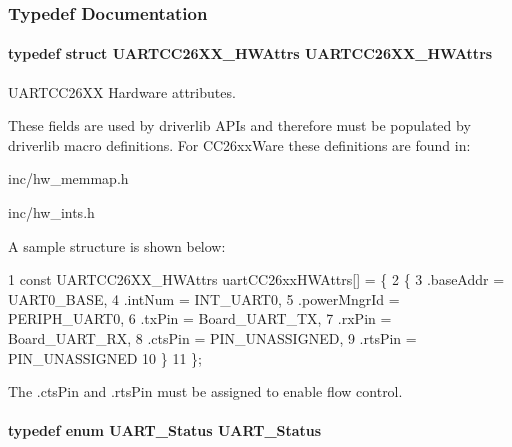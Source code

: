 \subsubsection{Typedef Documentation}
\paragraph[{U\+A\+R\+T\+C\+C26\+X\+X\+\_\+\+H\+W\+Attrs}]{\setlength{\rightskip}{0pt plus 5cm}typedef struct {\bf U\+A\+R\+T\+C\+C26\+X\+X\+\_\+\+H\+W\+Attrs}  {\bf U\+A\+R\+T\+C\+C26\+X\+X\+\_\+\+H\+W\+Attrs}}\label{_u_a_r_t_c_c26_x_x_8h_a779ad8f4640de879a0cdf41f4274206d}


U\+A\+R\+T\+C\+C26\+X\+X Hardware attributes. 

These fields are used by driverlib A\+P\+Is and therefore must be populated by driverlib macro definitions. For C\+C26xx\+Ware these definitions are found in\+:
\begin{DoxyItemize}
\item inc/hw\+\_\+memmap.\+h
\item inc/hw\+\_\+ints.\+h
\end{DoxyItemize}

A sample structure is shown below\+: 
\begin{DoxyCode}
1 const UARTCC26XX\_HWAttrs uartCC26xxHWAttrs[] = \{
2     \{
3         .baseAddr = UART0\_BASE,
4         .intNum = INT\_UART0,
5         .powerMngrId = PERIPH\_UART0,
6         .txPin = Board\_UART\_TX,
7         .rxPin = Board\_UART\_RX,
8         .ctsPin = PIN\_UNASSIGNED,
9         .rtsPin = PIN\_UNASSIGNED
10     \}
11 \};
\end{DoxyCode}


The .cts\+Pin and .rts\+Pin must be assigned to enable flow control. 
\paragraph[{U\+A\+R\+T\+\_\+\+Status}]{\setlength{\rightskip}{0pt plus 5cm}typedef enum {\bf U\+A\+R\+T\+\_\+\+Status}  {\bf U\+A\+R\+T\+\_\+\+Status}}\label{_u_a_r_t_c_c26_x_x_8h_a27818b82da9cf35d1f0f228b1f69b036}



